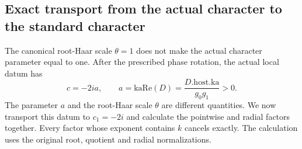 \subsection{Exact transport from the actual character to the standard character}
\label{sec:archimedean-character-transport}

The canonical root-Haar scale \(\theta=1\) does not make the
actual character parameter equal to one. After the prescribed
phase rotation, the actual local datum has
\[
       c=-2ia,\qquad
       a=\mathrm{kaRe}(D)
         =\frac{D.\mathrm{host.ka}}{g_0g_1}>0 .
\]
The parameter \(a\) and the root-Haar scale \(\theta\) are
different quantities. We now transport this datum to \(c_1=-2i\)
and calculate the pointwise and radial factors together.
Every factor whose exponent contains \(k\) cancels exactly.
The calculation uses the original root, quotient and radial
normalizations.\cite{current-construction-record}

